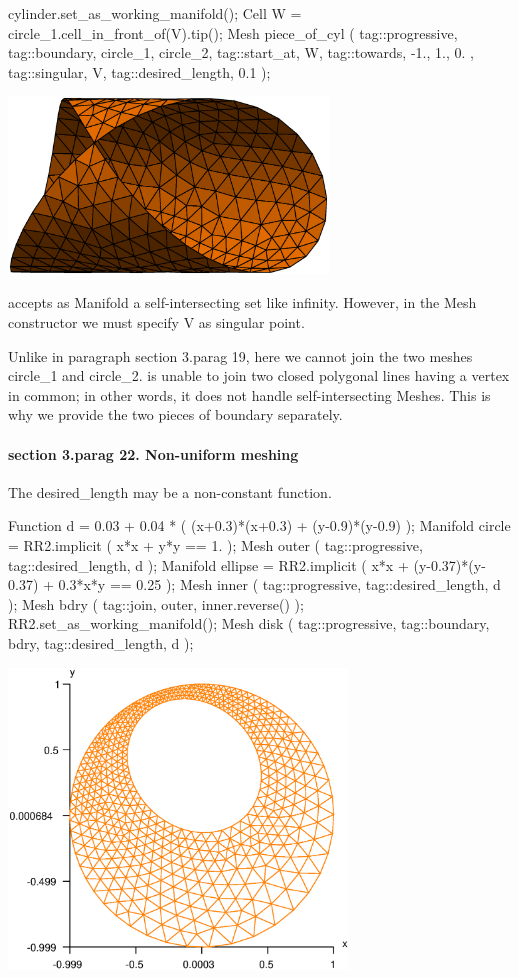 {   cylinder.set_as_working_manifold();
   Cell W = circle_1.cell_in_front_of(V).tip();
   Mesh piece_of_cyl ( tag::progressive, tag::boundary, circle_1, circle_2,
                       tag::start_at, W, tag::towards, { -1., 1., 0. },
                       tag::singular, V, tag::desired_length, 0.1           );
\endverbatim

\bigskip
\centerline{\includegraphics[width=85mm]{cyl.eps}}
\bigskip

{\ManiFEM} accepts as {\codett Manifold} a self-intersecting set like {\codett infinity}.
However, in the {\codett Mesh} constructor we must specify {\codett V} as singular point.

Unlike in paragraph \numb section 3.\numb parag 19, here we cannot {\codett join} the two
meshes {\codett circle\_1} and {\codett circle\_2}.
{\ManiFEM} is unable to join two closed polygonal lines having a vertex in common;
in other words, it does not handle self-intersecting {\codett Meshes}.
This is why we provide the two pieces of boundary separately.
\vfil\eject


\paragraph{\numb section 3.\numb parag 22. Non-uniform meshing}

The {\codett desired\_length} may be a non-constant function.

\verbatim
   Function d = 0.03 + 0.04 * ( (x+0.3)*(x+0.3) + (y-0.9)*(y-0.9) );
   Manifold circle = RR2.implicit ( x*x + y*y == 1. );
   Mesh outer ( tag::progressive, tag::desired_length, d );
   Manifold ellipse = RR2.implicit ( x*x + (y-0.37)*(y-0.37) + 0.3*x*y == 0.25 );
   Mesh inner ( tag::progressive, tag::desired_length, d );
   Mesh bdry ( tag::join, outer, inner.reverse() );
   RR2.set_as_working_manifold();
   Mesh disk ( tag::progressive, tag::boundary, bdry, tag::desired_length, d );
\endverbatim

\centerline{\includegraphics[width=90mm]{disk-non-unif.eps}}
\medskip

}
